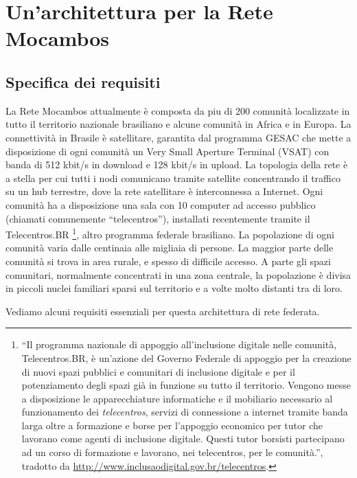 
\chapter{Un'architettura per la Rete Mocambos}
\label{Capitolo3}

\section{Specifica dei requisiti}
La Rete Mocambos attualmente è composta da piu di 200 comunità
localizzate in tutto il territorio nazionale brasiliano e alcune
comunità in Africa e in Europa. La connettività in Brasile è
satellitare, garantita dal programma GESAC che mette a disposizione di ogni
comunità un Very Small Aperture Terminal (VSAT) con banda di 512
kbit/s in download e 128 kbit/s in upload. La topologia della rete è a
stella per cui tutti i nodi comunicano tramite satellite concentrando
il traffico su un hub terrestre, dove la rete satellitare è
interconnessa a Internet. Ogni comunità ha a disposizione una sala con
10 computer ad accesso pubblico (chiamati comunemente
``telecentros''), installati recentemente tramite il Telecentros.BR
\footnote{``Il programma nazionale di appoggio all'inclusione digitale
  nelle comunità, Telecentros.BR, è un'azione del Governo Federale di
  appoggio per la creazione di nuovi spazi pubblici e comunitari di
  inclusione digitale e per il potenziamento degli spazi già in
  funzione su tutto il territorio. Vengono messe a disposizione le
  apparecchiature informatiche e il mobiliario necessario al
  funzionamento dei \textit{telecentros}, servizi di connessione a
  internet tramite banda larga oltre a formazione e borse per
  l'appoggio economico per tutor che lavorano come agenti di
  inclusione digitale. Questi tutor borsisti partecipano ad un corso
  di formazione e lavorano, nei telecentros, per le comunità.'',
  tradotto da \url{http://www.inclusaodigital.gov.br/telecentros}.}, altro
programma federale brasiliano. La popolazione di ogni comunità varia
dalle centinaia alle migliaia di persone. La maggior parte delle
comunità si trova in area rurale, e spesso di difficile accesso. A
parte gli spazi comunitari, normalmente concentrati in una zona
centrale, la popolazione è divisa in piccoli nuclei familiari sparsi
sul territorio e a volte molto distanti tra di loro. 

Vediamo alcuni requisiti essenziali per questa architettura di rete
federata.


